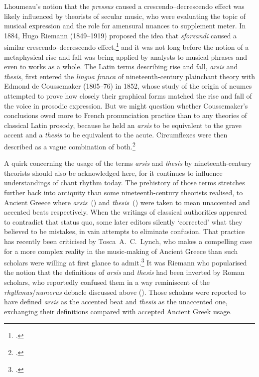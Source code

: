 Lhoumeau's notion that the \emph{pressus} caused a crescendo--decrescendo effect was likely influenced by theorists of secular music, who were evaluating the topic of musical expression and the role for amensural nuances to supplement meter.
%
In 1884, Hugo Riemann (1849--1919) proposed the idea that \emph{sforzandi} caused a similar crescendo--decrescendo effect,\footcite[48--9]{RiemannMusikalischeDynamikund1884} and it was not long before the notion of a metaphysical rise and fall was being applied by analysts to musical phrases and even to works as a whole.
The Latin terms describing rise and fall, \emph{arsis} and \emph{thesis}, first entered the \emph{lingua franca} of nineteenth-century plainchant theory with Edmond de Coussemaker (1805--76) in 1852, whose study of the origin of neumes attempted to prove how closely their graphical forms matched the rise and fall of the voice in prosodic expression.
But we might question whether Coussemaker's conclusions owed more to French pronunciation practice than to any theories of classical Latin prosody, because he held an \emph{arsis} to be equivalent to the grave accent and a \emph{thesis} to be equivalent to the acute.
Circumflexes were then described as a vague combination of both.\footcites[158]{CoussemakerHistoireharmonieau1852}[For an Anglophone description of Coussemaker's contributions, see][10]{RayburnGregorianChantHistory1964}

A quirk concerning the usage of the terms \emph{arsis} and \emph{thesis} by nineteenth-century theorists should also be acknowledged here, for it continues to influence understandings of chant rhythm today.
The prehistory of those terms stretches further back into antiquity than some nineteenth-century theorists realised, to Ancient Greece where \emph{arsis}~(\rmfamily) and \emph{thesis}~(\rmfamily) were taken to mean unaccented and accented beats respectively.
When the writings of classical authorities appeared to contradict that status quo, some later editors silently `corrected' what they believed to be mistakes, in vain attempts to eliminate confusion.
That practice has recently been criticised by Tosca~A.~C.\ Lynch, who makes a compelling case for a more complex reality in the music-making of Ancient Greece than such scholars were willing at first glance to admit.\footcite[492, 496]{LynchArsisThesisAncient2016}
It was Riemann who popularised the notion that the definitions of \emph{arsis} and \emph{thesis} had been inverted by Roman scholars, who reportedly confused them in a way reminiscent of the \emph{rhythmus}/\emph{numerus} debacle discussed above ().
Those scholars were reported to have defined \emph{arsis} as the accented beat and \emph{thesis} as the unaccented one, exchanging their definitions compared with accepted Ancient Greek usage.

